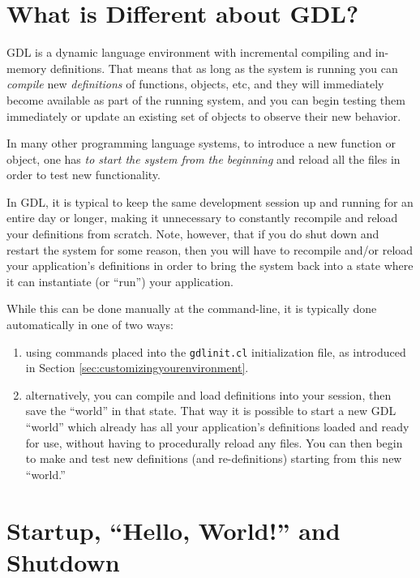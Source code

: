 \documentclass [11pt]{book}
\begin{document}
\section{What is Different about GDL?}

\label{sec:whatisdifferentaboutgdl?}

GDL is a dynamic language environment with incremental
compiling and in-memory definitions. That means that as long as the
system is running you can \emph{compile} new \emph{definitions} of functions, objects, etc, and they will immediately become
available as part of the running system, and you can begin testing
them immediately or update an existing set of objects to observe their
new behavior.

In many other programming language systems, to introduce a new
function or object, one has \emph{to start the system from the beginning} and reload all the files in order to test new functionality.
 
In GDL, it is typical to keep the same development session up and
running for an entire day or longer, making it unnecessary to
constantly recompile and reload your definitions from scratch. Note,
however, that if you do shut down and restart the system for some
reason, then you will have to recompile and/or reload your
application's definitions in order to bring the system back into a
state where it can instantiate (or ``run'') your application.

While this can be done manually at the command-line, it is typically
done automatically in one of two ways:

\begin{enumerate}

\item using commands placed into
the \texttt{gdlinit.cl} initialization file, as introduced in Section 
\ref{sec:customizingyourenvironment}.

\item alternatively, you can compile and load definitions into
your session, then save the ``world'' in that state. That way it is
possible to start a new GDL ``world'' which already has all your
application's definitions loaded and ready for use, without having to
procedurally reload any files. You can then begin to make and test new
definitions (and re-definitions) starting from this new ``world.''

\end{enumerate}



\section{Startup, ``Hello, World!'' and Shutdown}
\end{document}
